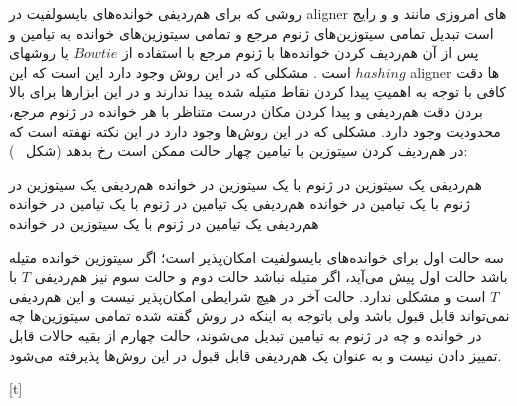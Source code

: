 

روشی که برای هم‌ردیفی خوانده‌های بایسولفیت در aligner های امروزی مانند  و  و  رایج است تبدیل تمامی سیتوزین‌های ژنوم مرجع و تمامی سیتوزین‌های خوانده به تیامین و پس از آن هم‌ردیف کردن خوانده‌ها با ژنوم مرجع با استفاده از $Bowtie$ یا روشهای $hashing$ است . مشکلی که در این روش وجود دارد این است که این aligner ها دقت کافی با توجه به اهمیتِ پیدا کردن نقاط متیله شده پیدا ندارند و در این ابزارها برای بالا بردن دقت هم‌ردیفی و پیدا کردن مکان درست متناظر با هر خوانده در ژنوم مرجع، محدودیت وجود دارد. مشکلی که در این روش‌ها وجود دارد در این نکته نهفته است که در هم‌ردیف کردن سیتوزین با تیامین چهار حالت ممکن است رخ بدهد (شکل ~):

 هم‌ردیفی یک سیتوزین در ژنوم با یک سیتوزین در خوانده 
 هم‌ردیفی یک سیتوزین در ژنوم با یک تیامین در خوانده 
 هم‌ردیفی یک تیامین در ژنوم با یک تیامین در خوانده 
 هم‌ردیفی یک تیامین در ژنوم با یک سیتوزین در خوانده 

سه حالت اول برای خوانده‌های بایسولفیت امکان‌پذیر است؛ اگر سیتوزین خوانده متیله باشد حالت اول پیش می‌آید، اگر متیله نباشد حالت دوم و حالت سوم نیز هم‌ردیفی $T$ با $T$ است و مشکلی ندارد. حالت آخر در هیچ شرایطی امکان‌پذیر نیست و این هم‌ردیفی نمی‌تواند قابل قبول باشد ولی باتوجه به اینکه در روش گفته شده تمامی سیتوزین‌ها چه در خوانده و چه در ژنوم به تیامین تبدیل می‌شوند، حالت چهارم از بقیه حالات قابل تمییز دادن نیست و به عنوان یک هم‌ردیفی قابل قبول در این روش‌ها پذیرفته می‌شود.


[t]


